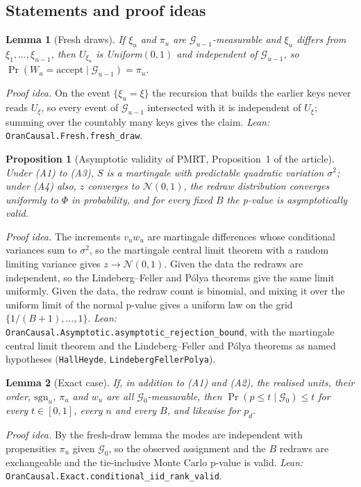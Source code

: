 \documentclass[pdflatex,sn-mathphys-num]{sn-jnl}%
\theoremstyle{thmstyleone}%
\newtheorem{proposition}[theorem]{Proposition}%
\newtheorem{lemma}{Lemma}%
\theoremstyle{thmstyletwo}%
\theoremstyle{thmstylethree}%
\begin{document}
\subsection{Statements and proof ideas}
\label{esm:statements}

\begin{lemma}[Fresh draws]
\label{lem:s_fresh}
If $\xi_u$ and $\pi_u$ are $\mathcal{G}_{u-1}$-measurable and $\xi_u$ differs from $\xi_1, \dots, \xi_{u-1}$, then
$U_{\xi_u}$ is Uniform$(0, 1)$ and independent of $\mathcal{G}_{u-1}$, so
$\Pr(W_u = \text{accept} \mid \mathcal{G}_{u-1}) = \pi_u$.
\end{lemma}
\noindent\emph{Proof idea.} On the event $\{\xi_u = \xi\}$ the recursion that builds the earlier keys never reads
$U_\xi$, so every event of $\mathcal{G}_{u-1}$ intersected with it is independent of $U_\xi$; summing over the countably
many keys gives the claim. \emph{Lean:} \texttt{OranCausal.Fresh.fresh\_draw}.

\begin{proposition}[Asymptotic validity of PMRT, Proposition~1 of the article]
\label{prop:s_pmrt}
Under (A1) to (A3), $S$ is a martingale with predictable quadratic variation $\sigma^2$; under (A4) also, $z$ converges
to $\mathcal{N}(0, 1)$, the redraw distribution converges uniformly to $\Phi$ in probability, and for every fixed $B$
the p-value is asymptotically valid.
\end{proposition}
\noindent\emph{Proof idea.} The increments $v_u w_u$ are martingale differences whose conditional variances sum to
$\sigma^2$, so the martingale central limit theorem with a random limiting variance gives $z \to \mathcal{N}(0, 1)$. Given
the data the redraws are independent, so the Lindeberg--Feller and P\'olya theorems give the same limit uniformly. Given
the data, the redraw count is binomial, and mixing it over the uniform limit of the normal p-value gives a uniform law on
the grid $\{1/(B+1), \dots, 1\}$. \emph{Lean:} \texttt{OranCausal.Asymptotic.asymptotic\_rejection\_bound}, with the
martingale central limit theorem and the Lindeberg--Feller and P\'olya theorems as named hypotheses
(\texttt{HallHeyde}, \texttt{LindebergFellerPolya}).

\begin{lemma}[Exact case]
\label{lem:s_exact}
If, in addition to (A1) and (A2), the realised units, their order, $\mathrm{sgn}_u$, $\pi_u$ and $w_u$ are all
$\mathcal{G}_0$-measurable, then $\Pr(p \le t \mid \mathcal{G}_0) \le t$ for every $t \in [0, 1]$, every $n$ and every
$B$, and likewise for $p_d$.
\end{lemma}
\noindent\emph{Proof idea.} By the fresh-draw lemma the modes are independent with propensities $\pi_u$ given
$\mathcal{G}_0$, so the observed assignment and the $B$ redraws are exchangeable and the tie-inclusive Monte Carlo
p-value is valid. \emph{Lean:} \texttt{OranCausal.Exact.conditional\_iid\_rank\_valid}.
\end{document}
